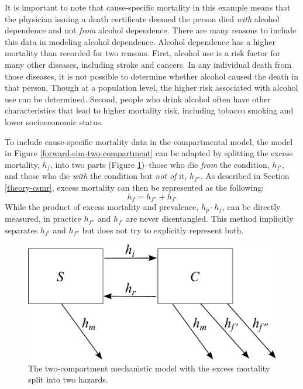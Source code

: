 It is important to note that cause-specific mortality in this 
example means that the physician issuing a death certificate 
deemed the person died \emph{with} alcohol dependence and 
not \emph{from} alcohol dependence.  There are many reasons 
to include this data in modeling alcohol dependence.  Alcohol 
dependence has a higher mortality than recorded for two reasons.
First, alcohol use is a risk factor for many other diseases, 
including stroke and cancers.  In any individual death
from those diseases, it is not possible to determine whether alcohol
caused the death in that person.  Though at a population level, 
the higher risk associated with alcohol use can be determined.  
Second, people who drink alcohol often have other characteristics 
that lead to higher mortality risk, including tobacco smoking 
and lower socioeconomic status.

To include cause-specific mortality data in the compartmental model,
the model in Figure \ref{forward-sim-two-compartment} can be adapted
by splitting the excess mortality, $h_{f}$, into two parts (Figure
\ref{fig:two_compartment_2f})--those who die \emph{from} the
condition, $h_{f'}$, and those who die \emph{with} the condition but
\emph{not of} it, $h_{f''}$.  As described in Section
\ref{theory-csmr}, excess mortality can then be represented as the
following:
    \begin{equation}
        h_{f} = h_{f''} + h_{f'}
    \end{equation}
While the product of excess mortality and prevalence, $h_{p} \cdot h_{f}$,
can be directly measured, in practice $h_{f''}$ and $h_{f'}$ are never
disentangled.  This method implicitly separates $h_{f'}$ and $h_{f''}$
but does not try to explicitly represent both.

    \begin{figure}[h]
        \begin{center}
            \includegraphics[width=\textwidth]{SC2.pdf}
            \caption{The two-compartment mechanistic model with the
              excess mortality split into two hazards.}
            \label{fig:two_compartment_2f}
        \end{center}
    \end{figure}

